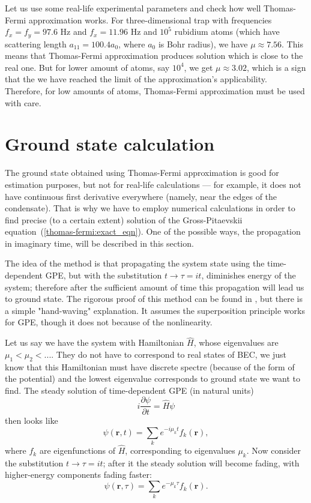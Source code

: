 \documentclass[12pt,notitlepage]{report}
\begin{document}
Let us use some real-life experimental parameters and check how well Thomas-Fermi approximation works.
For three-dimensional trap with frequencies $f_x = f_y = 97.6 \textrm{ Hz}$ and $f_x = 11.96 \textrm{ Hz}$
and $10^5$ rubidium atoms (which have scattering length $a_{11} = 100.4 a_0$, where $a_0$ is Bohr radius),
we have $\mu \approx 7.56$.
This means that Thomas-Fermi approximation produces solution which is close to the real one.
But for lower amount of atoms, say $10^4$, we get $\mu \approx 3.02$,
which is a sign that the we have reached the limit of the approximation's applicability.
Therefore, for low amounts of atoms, Thomas-Fermi approximation must be used with care.

\section{Ground state calculation}

The ground state obtained using Thomas-Fermi approximation is good for estimation purposes,
but not for real-life calculations --- for example, it does not have continuous first derivative everywhere
(namely, near the edges of the condensate).
That is why we have to employ numerical calculations in order to find precise (to a certain extent) solution
of the Gross-Pitaevskii equation~(\ref{thomas-fermi:exact_eqn}).
One of the possible ways, the propagation in imaginary time, will be described in this section.

The idea of the method is that propagating the system state using the time-dependent GPE,
but with the substitution $t \rightarrow \tau = it$, diminishes energy of the system;
therefore after the sufficient amount of time this propagation will lead us to ground state.
The rigorous proof of this method can be found in \cite{bao_du_2004}, but there is a simple "hand-waving" explanation.
It assumes the superposition principle works for GPE, though it does not because of the nonlinearity.

Let us say we have the system with Hamiltonian $\hat{H}$, whose eigenvalues are $\mu_1 < \mu_2 < ...$.
They do not have to correspond to real states of BEC, we just know that this Hamiltonian must have discrete spectre
(because of the form of the potential) and the lowest eigenvalue corresponds to ground state we want to find.
The steady solution of time-dependent GPE (in natural units)
\[ i \frac{\partial \psi}{\partial t} = \hat{H} \psi \]
then looks like
\[ \psi(\mathbf{r}, t) = \sum_k e^{-i \mu_k t} f_k(\mathbf{r}), \]
where $f_k$ are eigenfunctions of $\hat{H}$, corresponding to eigenvalues $\mu_k$.
Now consider the substitution $t \rightarrow \tau = it$; after it the steady solution will become fading,
with higher-energy components fading faster:
\[ \psi(\mathbf{r}, \tau) = \sum_k e^{-\mu_k \tau} f_k(\mathbf{r}). \]
\end{document}
